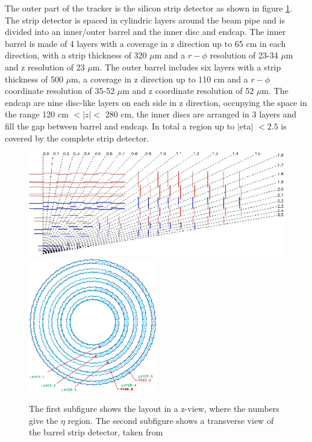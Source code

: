 The outer part of the tracker is the silicon strip detector as shown in figure \ref{fig:fig_2_7}. The strip detector is spaced in cylindric layers around the beam pipe and is divided into an inner/outer barrel and the inner disc and endcap. The inner barrel is made of 4 layers with a coverage in z direction up to 65 cm in each direction, with a strip thickness of 320 $\mu$m and a $r-\phi$ resolution of 23-34 $\mu$m and z resolution of 23 $\mu$m. The outer barrel includes six layers with a strip thickness of 500 $\mu$m, a coverage in z direction up to 110 cm and a $r-\phi$ coordinate resolution of 35-52 $\mu$m and z coordinate resolution of 52 $\mu$m. The endcap are nine disc-like layers on each side in z direction, occupying the space in the range 120 cm $< |z| < $ 280 cm, the inner discs are arranged in 3 layers and fill the gap between barrel and endcap. In total a region up to $|$\gls{eta}$|$ $< 2.5$ is covered by the complete strip detector. \\

\begin{figure}[ht]
	\centering
	\includegraphics[width=1\textwidth]{pictures/CMS_strip.pdf}
	\includegraphics[width=0.5\textwidth]{pictures/CMS_strip2.pdf}

	\caption[Strip detector of CMS]{The first subfigure shows the layout in a z-view, where the numbers give the $\eta$ region. The second subfigure shows a transverse view of the barrel strip detector, taken from \cite{CMS2, ECAL}}
	\label{fig:fig_2_7}
\end{figure}

